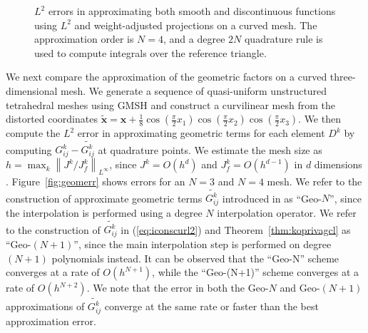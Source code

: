 \documentclass[10pt]{amsart}
\newcommand{\logLogSlopeTriangleFlip}[5]
{

    \pgfplotsextra
    {
        \pgfkeysgetvalue{/pgfplots/xmin}{\xmin}
        \pgfkeysgetvalue{/pgfplots/xmax}{\xmax}
        \pgfkeysgetvalue{/pgfplots/ymin}{\ymin}
        \pgfkeysgetvalue{/pgfplots/ymax}{\ymax}

        \pgfmathsetmacro{\xBrel}{#1-#2}
        \pgfmathsetmacro{\yBrel}{#3}
        \pgfmathsetmacro{\xCrel}{#1}

        \pgfmathsetmacro{\lnxB}{\xmin*(1-(#1-#2))+\xmax*(#1-#2)} %
        \pgfmathsetmacro{\lnxA}{\xmin*(1-#1)+\xmax*#1} %
        \pgfmathsetmacro{\lnyA}{\ymin*(1-#3)+\ymax*#3} %
        \pgfmathsetmacro{\lnyC}{\lnyA+#4*(\lnxA-\lnxB)}
        \pgfmathsetmacro{\yCrel}{\lnyC-\ymin)/(\ymax-\ymin)} %

	\pgfmathsetmacro{\xArel}{\xBrel}
        \pgfmathsetmacro{\yArel}{\yCrel}

        \coordinate (A) at (rel axis cs:\xArel,\yArel);
        \coordinate (B) at (rel axis cs:\xBrel,\yBrel);
        \coordinate (C) at (rel axis cs:\xCrel,\yCrel);

        \draw[#5]   (A)-- node[pos=0.5,anchor=east] {#4}
                    (B)-- 
                    (C)-- node[pos=0.5,anchor=south] {}
                    cycle;
    }
}
\theoremstyle{definition}
\theoremstyle{lemma}
\theoremstyle{theorem}
\theoremstyle{assumption}
\renewcommand{\hat}{\widehat}
\renewcommand{\tilde}{\widetilde}
\newcommand{\nor}[1]{\left\| #1 \right\|}
\newcommand{\LRp}[1]{\left( #1 \right)}
\newcommand{\note}[1]{{\color{blue}{#1}}}
\begin{document}
{\begin{figure}
{
}
\caption{$L^2$ errors in approximating both smooth and discontinuous functions using $L^2$ and weight-adjusted projections on a curved mesh.  The approximation order is $N=4$, and a degree $2N$ quadrature rule is used to compute integrals over the reference triangle. }
\label{fig:superconverge}
\end{figure}

We next compare the approximation of the geometric factors on a curved three-dimensional mesh.  We generate a sequence of quasi-uniform unstructured tetrahedral meshes using GMSH \cite{geuzaine2009gmsh} and construct a curvilinear mesh from the distorted coordinates $\tilde{\bm{x}} = \bm{x} + \frac{1}{8}\cos\LRp{\frac{\pi}{2}x_1}\cos\LRp{\frac{\pi}{2}x_2}\cos\LRp{\frac{\pi}{2}x_3}$.
We then compute the $L^2$ error in approximating geometric terms for each element $D^k$ by computing $G^k_{ij}-\tilde{G^k_{ij}}$ at quadrature points.  
We estimate the mesh size as $h = \max_k \nor{J^k/J^k_f}_{L^{\infty}}$, since $J^k = O(h^d)$ and $J^k_f = O(h^{d-1})$ in $d$ dimensions \cite{chan2015gpu}.  Figure~\ref{fig:geomerr} shows errors for an $N=3$ and $N=4$ mesh.  We refer to the construction of approximate geometric terms $\tilde{G^k_{ij}}$ introduced in \cite{kopriva2006metric, hindenlang2012explicit} as ``Geo-$N$'', since the interpolation is performed using a degree $N$ interpolation operator.  We refer to the construction of $\tilde{G^k_{ij}}$ in (\ref{eq:iconscurl2}) and Theorem~\ref{thm:koprivagcl} as ``Geo-$(N+1)$'', since the main interpolation step is performed on degree $(N+1)$ polynomials instead.  It can be observed that the ``Geo-N'' scheme converges at a rate of $O(h^{N+1})$, while the ``Geo-(N+1)'' scheme converges at a rate of $O(h^{N+2})$.  We note that the error in both the Geo-$N$ and Geo-$(N+1)$ approximations of $\tilde{G^k_{ij}}$ converge at the same rate or faster than the best approximation error.  

}
\end{document}
